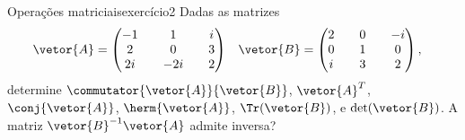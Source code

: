 \begin{exercício}{Operações matriciais}{exercício2}
    Dadas as matrizes
    \begin{align*}
        \vetor{A} &= \begin{pmatrix}
            -1 && 1 && i\\
            2 && 0 && 3\\
            2i &&-2i&& 2
        \end{pmatrix}&
        \vetor{B} &= \begin{pmatrix}
            2 && 0 &&-i\\
            0 && 1 && 0\\
            i && 3 && 2
        \end{pmatrix},
    \end{align*}
    determine \(\commutator{\vetor{A}}{\vetor{B}}\), \(\vetor{A}^T\), \(\conj{\vetor{A}}\), \(\herm{\vetor{A}}\), \(\Tr(\vetor{B})\), e \(\det(\vetor{B})\). A matriz \(\vetor{B}^{-1}\vetor{A}\) admite inversa?
\end{exercício}
